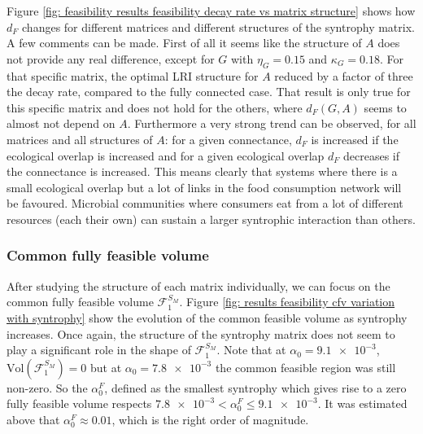 \documentclass[12pt, titlepage]{report}
\begin{document}
  Figure \ref{fig: feasibility results feasibility decay rate vs matrix structure} shows how $d_F$ changes for different matrices and different structures of the syntrophy matrix. A few comments can be made. First of all it seems like the structure of $A$ does not provide any real difference, except for $G$ with $\eta_G=0.15$ and $\kappa_G=0.18$. For that specific matrix, the optimal LRI structure for $A$ reduced by a factor of three the decay rate, compared to the fully connected case. That result is only true for this specific matrix and does not hold for the others, where $d_F(G,A)$ seems to almost not depend on $A$. Furthermore a very strong trend can be observed, for all matrices and all structures of $A$: for a given connectance, $d_F$ is increased if the ecological overlap is increased and for a given ecological overlap $d_F$ decreases if the connectance is increased.
  This means clearly that systems where there is a small ecological overlap but a lot of links in the food consumption network will be favoured. Microbial communities where consumers eat from a lot of different resources (\ie each their own) can sustain a larger syntrophic interaction than others.


  \subsubsection{Common fully feasible volume}
 After studying the structure of each matrix individually, we can focus on the common fully feasible volume $\mathcal{F}_1^{S_M}$. Figure \ref{fig: results feasibility cfv variation with syntrophy} show the evolution of the common feasible volume as syntrophy increases. Once again, the structure of the syntrophy matrix does not seem to play a significant role in the shape of $\mathcal{F}_1^{S_M}$. Note that at $\alpha_0=\num{9.1e-3}$, $\text{Vol}\left(\mathcal{F}_1^{S_M}\right)=0$ but at $\alpha_0=\num{7.8e-3}$ the common feasible region was still non-zero. So the  $\alpha_0^F$, defined as the smallest syntrophy which gives rise to a zero fully feasible volume respects $\num{7.8e-3} < \alpha_0^F \leq \num{9.1e-3}$. It was estimated above that $\alpha_0^F \approx 0.01$, which is the right order of magnitude.
\end{document}
